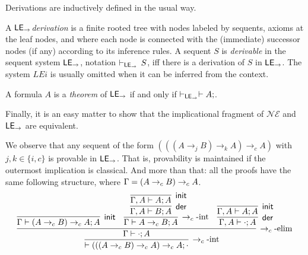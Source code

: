 Derivations are  inductively defined in the usual way. 
\begin{definition}\label{def:der}
A $\mathsf{LE}_{\to}${\em derivation} is a finite rooted tree with nodes labeled by
sequents, axioms at the leaf nodes, and where each node is connected
with the (immediate) successor nodes (if any) according to its
inference rules. A sequent $S$ is \emph{derivable} in the sequent
system $\mathsf{LE}_{\to}$, notation $\vdash_{\mathsf{LE}_{\to}} \,{S}$, iff there is a derivation
of $S$ in $\mathsf{LE}_{\to}$.  The system $LEi$ is usually omitted when it can
be inferred from the context.

A formula $A$ is a {\em theorem} of $\mathsf{LE}_{\to}$ if and only if $\vdash_{\mathsf{LE}_{\to}} \vdash A;$. 
\end{definition}

Finally, it is an easy matter to show that the implicational fragment of $\mathcal{NE}$ and $\mathsf{LE}_{\to}$ are equivalent.


\begin{example}
\label{ex:Peirce}
We observe that any sequent of the form  $(((A \to_{j} B) \to_{k} A) \to_{c} A)$ with $j,k\in\{i,c\}$ is provable in  $\mathsf{LE}_{\to}$. That is, provability is maintained if the outermost implication is classical. And more than that: all the proofs have the same following structure, where $\Gamma = (A\rightarrow_c B)\rightarrow_c A$.
\[
\infer[\cimp\mbox{-int}]{\stp{}{(((A\cimp B)\cimp A)\cimp A}{\cdot}}
{\infer[\cimp\mbox{-elim}]{\stp{\Gamma}{\cdot}{A}}
{\infer[\init]{\stp{\Gamma}{(A\cimp B)\cimp A}{A}}{}&
\infer[\cimp\mbox{-int}]{\stp{\Gamma}{A\cimp B}{A}}
{\infer[\der]{\stp{\Gamma,A}{B}{A}}
{\infer[\init]{\stp{\Gamma,A}{A}{A}}{}}}&
\infer[\der]{\stp{\Gamma,A}{\cdot}{A}}
{\infer[\init]{\stp{\Gamma,A}{A}{A}}{}}}}
\]
\end{example}

